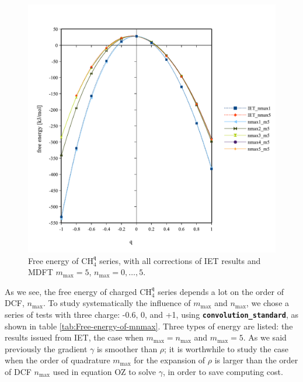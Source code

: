 \begin{figure}[!th]
\begin{centering}
\includegraphics[bb=0bp 20bp 510bp 490bp,width=0.9\columnwidth]{_figure/results/ch4_inter_nmax}
\par\end{centering}
\caption[Free energy of $\mathrm{C}\mathrm{H}_{4}^{\mathfrak{q}}$ series (with
corrections) for different $n_{\max}$ ($m_{\max}=5$)]{Free energy of $\mathrm{C}\mathrm{H}_{4}^{\mathfrak{q}}$ series,
with all corrections of \acs{IET} results and \acs{MDFT} $m_{\max}=5$,
$n_{\max}=0,\ldots,5$.\label{fig:Comparison-to-IET,with-corr-nmax}}
\end{figure}

As we see, the free energy of charged $\mathrm{C}\mathrm{H}_{4}^{\mathfrak{q}}$
series depends a lot on the order of \acs{DCF}, $n_{\max}$. To study
systematically the influence of $m_{\max}$ and $n_{\max}$, we chose
a series of tests with three charge: -0.6, 0, and +1, using \texttt{\textbf{convolution\_standard}},
as shown in table \ref{tab:Free-energy-of-mnmax}. Three types of
energy are listed: the results issued from \acs{IET}, the case when
$m_{\max}=n_{\max}$ and $m_{\max}=5$. As we said previously the
gradient $\gamma$ is smoother than $\rho$; it is worthwhile to study
the case when the order of quadrature $m_{\max}$ for the expansion
of $\rho$ is larger than the order of \acs{DCF} $n_{\max}$ used
in equation \acs{OZ} to solve $\gamma$, in order to save computing
cost.

